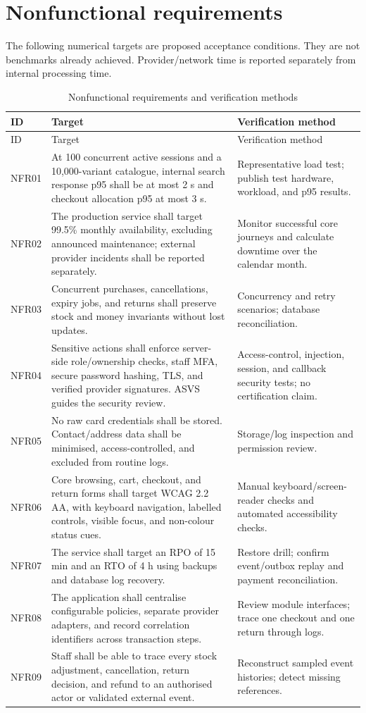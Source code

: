 \section{Nonfunctional requirements}
The following numerical targets are proposed acceptance conditions. They are not benchmarks already achieved. Provider/network time is reported separately from internal processing time.
\begin{longtable}{P{.1\linewidth}P{.54\linewidth}P{.26\linewidth}}
\caption{Nonfunctional requirements and verification methods}\label{tab:nfr}\\
\toprule ID & Target & Verification method \\\midrule\endfirsthead
\toprule ID & Target & Verification method \\\midrule\endhead
NFR01 & At 100 concurrent active sessions and a 10,000-variant catalogue, internal search response p95 shall be at most 2 s and checkout allocation p95 at most 3 s. & Representative load test; publish test hardware, workload, and p95 results.\\
NFR02 & The production service shall target 99.5\% monthly availability, excluding announced maintenance; external provider incidents shall be reported separately. & Monitor successful core journeys and calculate downtime over the calendar month.\\
NFR03 & Concurrent purchases, cancellations, expiry jobs, and returns shall preserve stock and money invariants without lost updates. & Concurrency and retry scenarios; database reconciliation.\\
NFR04 & Sensitive actions shall enforce server-side role/ownership checks, staff MFA, secure password hashing, TLS, and verified provider signatures. ASVS guides the security review. & Access-control, injection, session, and callback security tests; no certification claim\cite{asvs}.\\
NFR05 & No raw card credentials shall be stored. Contact/address data shall be minimised, access-controlled, and excluded from routine logs. & Storage/log inspection and permission review.\\
NFR06 & Core browsing, cart, checkout, and return forms shall target WCAG 2.2 AA, with keyboard navigation, labelled controls, visible focus, and non-colour status cues. & Manual keyboard/screen-reader checks and automated accessibility checks\cite{wcag}.\\
NFR07 & The service shall target an RPO of 15 min and an RTO of 4 h using backups and database log recovery. & Restore drill; confirm event/outbox replay and payment reconciliation.\\
NFR08 & The application shall centralise configurable policies, separate provider adapters, and record correlation identifiers across transaction steps. & Review module interfaces; trace one checkout and one return through logs.\\
NFR09 & Staff shall be able to trace every stock adjustment, cancellation, return decision, and refund to an authorised actor or validated external event. & Reconstruct sampled event histories; detect missing references.\\
\bottomrule
\end{longtable}

